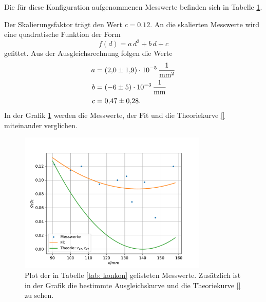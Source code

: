 Die für diese Konfiguration aufgenommenen Messwerte befinden sich in Tabelle \ref{fig: konkon}.

Der Skalierungsfaktor trägt den Wert $c=\num{0.12}$.
An die skalierten Messwerte wird eine quadratische Funktion der Form
\begin{equation*}
  f(d)=a\,d^2+b\,d+c
\end{equation*}
gefittet. Aus der Ausgleichsrechnung folgen die Werte
\begin{align}
  \label{eq: fit_konkon}
  \begin{aligned}
    a&=\SI{2.0\pm 1.9 e-5}{\per\square\milli\meter}\\
    b&=\SI{-6\pm5 e-3}{\per\milli\meter}\\
    c&=\num{0.47\pm0.28}.
  \end{aligned}
\end{align}
In der Grafik \ref{fig: konkon} werden die Messwerte, der Fit und die Theoriekurve \eqref{} miteinander verglichen. %

\begin{figure}[h!]
  \centering
  \includegraphics[width=0.8\textwidth]{../Messdaten/plots/konkon.pdf}
  \caption{Plot der in Tabelle \ref{tab: konkon} gelisteten Messwerte. Zusätzlich ist in der Grafik die bestimmte Ausgleichskurve und die Theoriekurve \eqref{} zu sehen.} %
  \label{fig: konkon}
\end{figure}

\FloatBarrier
\FloatBarrier
